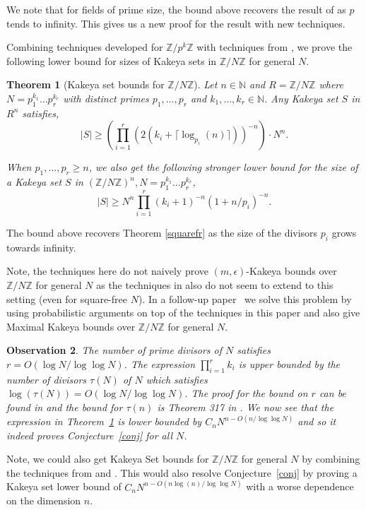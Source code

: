 \documentclass[11pt]{article}
\numberwithin{equation}{section}
\newtheorem{thm}{Theorem}[section]
\newtheorem{obs}[thm]{Observation}
\def\Z{{\mathbb{Z}}}
\def\N{{\mathbb{N}}}
\begin{document}
We note that for fields of prime size, the bound above recovers the result of \cite{dvir2013extensions} as $p$ tends to infinity. This gives us a new proof for the result with new techniques. 

Combining techniques developed for $\Z/p^k\Z$ with techniques from \cite{dhar2021proof}, we prove the following lower bound for sizes of Kakeya sets in $\Z/N\Z$ for general $N$. 

\begin{thm}[Kakeya set bounds for $\Z/N\Z$]\label{main}
Let $n\in \N$ and $R=\Z/N\Z$  where $N=p_1^{k_1}\hdots p_r^{k_r}$ with distinct primes $p_1,\hdots,p_r$ and $k_1,\hdots,k_r\in \N$. Any Kakeya set $S$ in $R^n$ satisfies,
$$|S|\ge \left(\prod\limits_{i=1}^r (2(k_i+\lceil \log_{p_i}(n)\rceil))^{-n}\right)\cdot N^n.$$

When $p_1,\hdots,p_r\ge n$, we also get the following stronger lower bound for the size of a Kakeya set $S$ in $(\Z/N\Z)^n,N=p_1^{k_1}\hdots p_r^{k_r}$,
$$|S|\ge N^n\prod\limits_{i=1}^r(k_i+1)^{-n}(1+n/p_i)^{-n}.$$
\end{thm}

The bound above recovers Theorem \ref{squarefr} as the size of the divisors $p_i$ grows towards infinity.

Note, the techniques here do not naively prove $(m,\epsilon)$-Kakeya bounds over $\Z/N\Z$ for general $N$ as the techniques in \cite{dhar2021proof} also do not seem to extend to this setting (even for square-free $N$). In a follow-up paper~\cite{dhar2022maximal} we solve this problem by using probabilistic arguments on top of the techniques in this paper and also give Maximal Kakeya bounds over $\Z/N\Z$ for general $N$.

\begin{obs}\label{obs:no}
The number of prime divisors of $N$ satisfies $r = O( \log N / \log \log N)$. The expression $\prod_{i=1}^{r} k_i$ is upper bounded by the number of divisors $\tau(N)$ of $N$ which satisfies $\log(\tau(N))=O( \log N / \log \log N)$. The proof for the bound on $r$ can be found in \cite{zbMATH02610444} and the bound for $\tau(n)$ is {\em Theorem 317} in \cite{Hardy2008AnIT}. We now see that the expression in Theorem~\ref{main} is lower bounded by $C_n N^{n - O(n/\log \log N)}$ and so it indeed proves Conjecture~\ref{conj} for all $N$. \end{obs}

Note, we could also get Kakeya Set bounds for $\Z/N\Z$ for general $N$ by combining the techniques from \cite{arsovski2021padic} and \cite{dhar2021proof}. This would also resolve Conjecture~\ref{conj} by proving a Kakeya set lower bound of $C_n N^{n - O(n\log(n)/\log \log N)}$ with a worse dependence on the dimension $n$.
\end{document}
